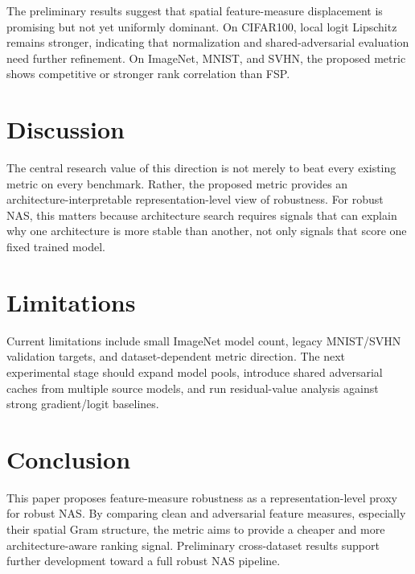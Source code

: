 \documentclass[10pt,twocolumn]{article}
\begin{document}
The preliminary results suggest that spatial feature-measure displacement is promising but not yet uniformly dominant.
On CIFAR100, local logit Lipschitz remains stronger, indicating that normalization and shared-adversarial evaluation need further refinement.
On ImageNet, MNIST, and SVHN, the proposed metric shows competitive or stronger rank correlation than FSP.

\section{Discussion}

The central research value of this direction is not merely to beat every existing metric on every benchmark.
Rather, the proposed metric provides an architecture-interpretable representation-level view of robustness.
For robust NAS, this matters because architecture search requires signals that can explain why one architecture is more stable than another, not only signals that score one fixed trained model.

\section{Limitations}

Current limitations include small ImageNet model count, legacy MNIST/SVHN validation targets, and dataset-dependent metric direction.
The next experimental stage should expand model pools, introduce shared adversarial caches from multiple source models, and run residual-value analysis against strong gradient/logit baselines.

\section{Conclusion}

This paper proposes feature-measure robustness as a representation-level proxy for robust NAS.
By comparing clean and adversarial feature measures, especially their spatial Gram structure, the metric aims to provide a cheaper and more architecture-aware ranking signal.
Preliminary cross-dataset results support further development toward a full robust NAS pipeline.



\end{document}
